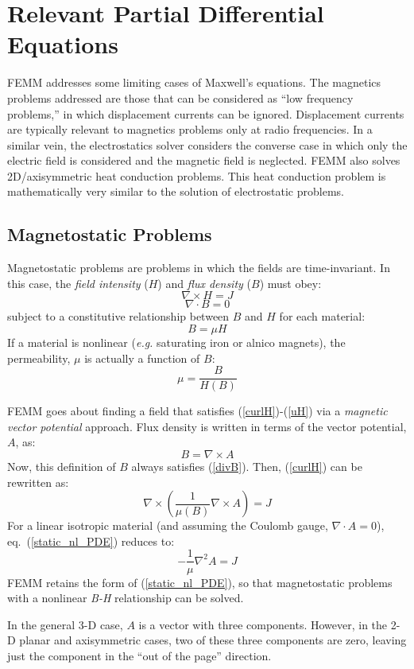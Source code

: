 \documentclass[12pt]{report}
\newcommand{\be}{\begin{equation}}
\newcommand{\ee}{\end{equation}}
\newcommand{\Curl}{\nabla \times}
\newcommand{\Div}{\nabla \cdot}
\begin{document}
\section{Relevant Partial Differential Equations}

FEMM addresses some limiting cases of Maxwell's equations.  The
magnetics problems addressed are those that can be considered as
``low frequency problems,'' in which displacement currents can be
ignored. Displacement currents are typically relevant to magnetics
problems only at radio frequencies.  In a similar vein, the
electrostatics solver considers the converse case in which only the
electric field is considered and the magnetic field is neglected.
FEMM also solves 2D/axisymmetric heat conduction problems.
This heat conduction problem is mathematically very similar to the
solution of electrostatic problems.

\subsection{Magnetostatic Problems}

Magnetostatic problems are problems in which the fields are
time-invariant.  In this case, the {\em field intensity} ($H$) and
{\em flux density} ($B$) must obey:
\be \label{curlH} \Curl H = J \ee
\be \label{divB} \Div B = 0 \ee
subject to a constitutive relationship between $B$ and $H$ for each
material:
\be \label{uH} B= \mu H \ee
If a material is nonlinear ({\em e.g.} saturating iron or alnico
magnets), the permeability, $\mu$ is actually a function of $B$:
\be \mu= \frac{B}{H(B)} \ee

FEMM goes about finding a field that satisfies
(\ref{curlH})-(\ref{uH}) via a {\em magnetic vector potential}
approach. Flux density is written in terms of the vector potential,
$A$, as:
\be \label{defA} B = \Curl A \ee
Now, this definition of $B$ always satisfies (\ref{divB}).  Then,
(\ref{curlH}) can be rewritten as:
\be \label{static_nl_PDE} \nabla \times \left( \frac{1}{\mu(B)} \nabla \times A \right) = J \ee
For a linear isotropic material (and assuming the Coulomb gauge, $\nabla \cdot A =0$), eq.~(\ref{static_nl_PDE}) reduces to:
\be \label{static_lin_PDE} -\frac{1}{\mu} \nabla^2 A = J \ee
FEMM retains the form of (\ref{static_nl_PDE}), so that
magnetostatic problems with a nonlinear {\em B-H} relationship can
be solved.

In the general 3-D case, $A$ is a vector with three components.
However, in the 2-D planar and axisymmetric cases, two of these
three components are zero, leaving just the component in the ``out
of the page'' direction.
\end{document}
